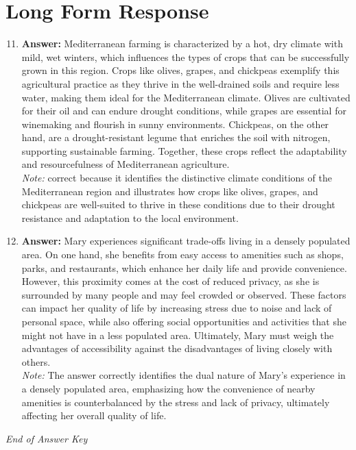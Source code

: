 \documentclass[12pt]{article}
\begin{document}
\section*{Long Form Response}
\begin{enumerate}[label=\arabic*.]
\setcounter{enumi}{10}
\item \textbf{Answer:} Mediterranean farming is characterized by a hot, dry climate with mild, wet winters, which influences the types of crops that can be successfully grown in this region. Crops like olives, grapes, and chickpeas exemplify this agricultural practice as they thrive in the well-drained soils and require less water, making them ideal for the Mediterranean climate. Olives are cultivated for their oil and can endure drought conditions, while grapes are essential for winemaking and flourish in sunny environments. Chickpeas, on the other hand, are a drought-resistant legume that enriches the soil with nitrogen, supporting sustainable farming. Together, these crops reflect the adaptability and resourcefulness of Mediterranean agriculture.
\\ \textit{Note:} correct because it identifies the distinctive climate conditions of the Mediterranean region and illustrates how crops like olives, grapes, and chickpeas are well-suited to thrive in these conditions due to their drought resistance and adaptation to the local environment.
\item \textbf{Answer:} Mary experiences significant trade-offs living in a densely populated area. On one hand, she benefits from easy access to amenities such as shops, parks, and restaurants, which enhance her daily life and provide convenience. However, this proximity comes at the cost of reduced privacy, as she is surrounded by many people and may feel crowded or observed. These factors can impact her quality of life by increasing stress due to noise and lack of personal space, while also offering social opportunities and activities that she might not have in a less populated area. Ultimately, Mary must weigh the advantages of accessibility against the disadvantages of living closely with others.
\\ \textit{Note:} The answer correctly identifies the dual nature of Mary's experience in a densely populated area, emphasizing how the convenience of nearby amenities is counterbalanced by the stress and lack of privacy, ultimately affecting her overall quality of life.
\end{enumerate}

\vfill
\noindent\textit{End of Answer Key}
\end{document}
